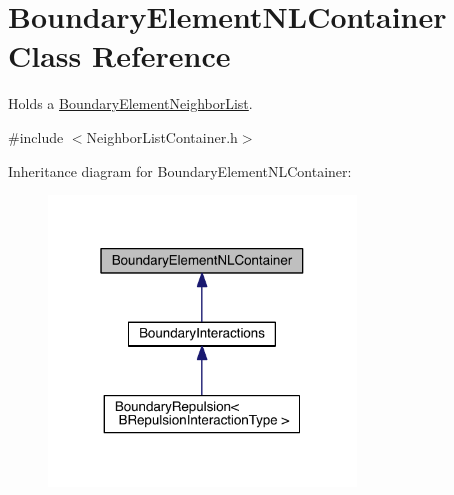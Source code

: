 \hypertarget{classBoundaryElementNLContainer}{\section{Boundary\+Element\+N\+L\+Container Class Reference}
\label{classBoundaryElementNLContainer}
}


Holds a \hyperlink{classBoundaryElementNeighborList}{Boundary\+Element\+Neighbor\+List}.  




{\ttfamily \#include $<$Neighbor\+List\+Container.\+h$>$}



Inheritance diagram for Boundary\+Element\+N\+L\+Container\+:\nopagebreak
\begin{figure}[H]
\begin{center}
\leavevmode
\includegraphics[width=232pt]{classBoundaryElementNLContainer__inherit__graph}
\end{center}
\end{figure}


